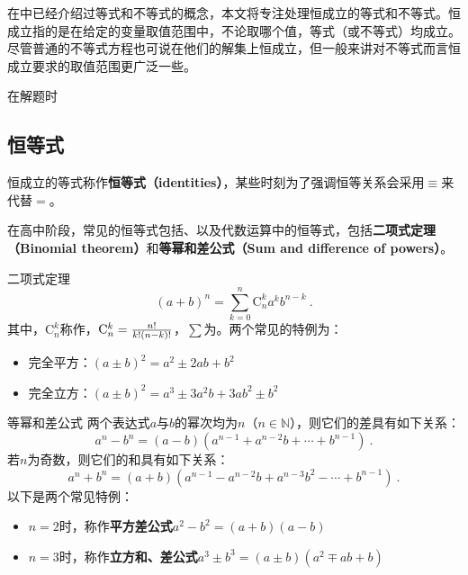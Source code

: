 

\begin{issues}
\issueDraft
\end{issues}

在中已经介绍过等式和不等式的概念，本文将专注处理恒成立的等式和不等式。恒成立指的是在给定的变量取值范围中，不论取哪个值，等式（或不等式）均成立。尽管普通的不等式方程也可说在他们的解集上恒成立，但一般来讲对不等式而言恒成立要求的取值范围更广泛一些。

在解题时

\subsection{恒等式}\label{sub_HsIden_1}

恒成立的等式称作\textbf{恒等式（identities）}，某些时刻为了强调恒等关系会采用$\equiv$来代替$=$。

在高中阶段，常见的恒等式包括、以及代数运算中的恒等式，包括\textbf{二项式定理（Binomial theorem）}和\textbf{等幂和差公式（Sum and difference of powers）}。
\begin{theorem}{二项式定理}
\begin{equation}
\displaystyle(a+b)^n=\sum_{k=0}^n{\mathrm C}_n^ka^kb^{n-k}~.
\end{equation}
其中，${\mathrm C}_n^k$称作，${\mathrm C}_n^k={n!\over k!(n-k)!}$，$\sum$为。两个常见的特例为：
\begin{itemize}
\item 完全平方：$(a\pm b)^2=a^2\pm2ab+b^2$
\item 完全立方：$(a\pm b)^2=a^3\pm 3a^2b+3ab^2\pm b^2$
\end{itemize}
\end{theorem}

\begin{theorem}{等幂和差公式}
两个表达式$a$与$b$的幂次均为$n$（$n\in\mathbb{N}$），则它们的差具有如下关系：
\begin{equation}
a^n - b^n = (a - b)(a^{n-1} + a^{n-2}b + \cdots + b^{n-1})~.
\end{equation}
若$n$为奇数，则它们的和具有如下关系：
\begin{equation}
a^n + b^n = (a + b)(a^{n-1} - a^{n-2}b + a^{n-3}b^2 - \cdots + b^{n-1})~.
\end{equation}
以下是两个常见特例：
\begin{itemize}
\item $n=2$时，称作\textbf{平方差公式}$a^2-b^2=(a+b)(a-b)$
\item $n=3$时，称作\textbf{立方和、差公式}$a^3\pm b^3=(a\pm b)(a^2\mp ab+b)$
\end{itemize}
\end{theorem}

